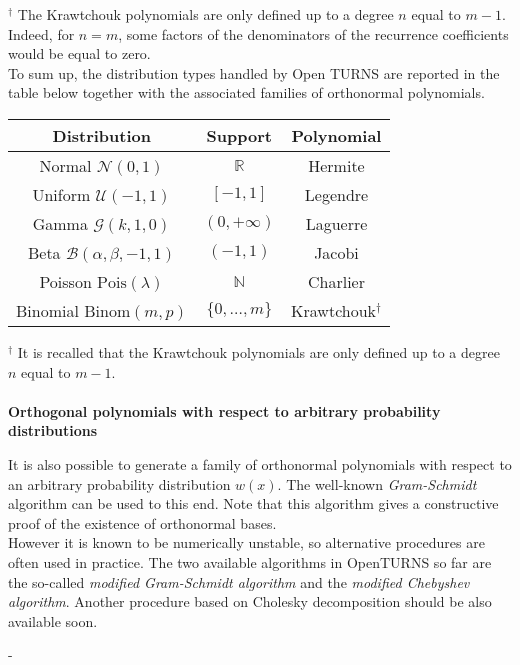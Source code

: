 {\begin{center}
  \end{center} 
{\footnotesize $^{\dagger}$ The Krawtchouk polynomials are only defined up to a degree $n$ equal to $m-1$. Indeed, for $n=m$, some factors of the denominators of the recurrence coefficients would be equal to zero.} \\

To sum up, the distribution types handled by Open TURNS are reported in the table below together with the associated families of orthonormal polynomials. \\

\begin{center}
\begin{tabular}{ccc}
\hline
Distribution & Support & Polynomial \\
\hline
Normal $\mathcal{N}(0,1)$      &  $\mathbb{R}$ & Hermite \\
Uniform	$\mathcal{U}(-1,1)$	&   $[-1,1] $     & Legendre \\
Gamma $\mathcal{G}(k,1,0)$   & $(0,+\infty)$   & Laguerre \\
Beta $\mathcal{B}(\alpha,\beta,-1,1)$     &  $(-1,1)$       & Jacobi \\
Poisson $\mbox{Pois}(\lambda)$ & $\mathbb{N}$ & Charlier \\
Binomial $\mbox{Binom}(m,p)$ & $\{0,\dots,m\}$ & Krawtchouk$^{\dagger}$ \\
\hline
\end{tabular}  
\end{center}
{\footnotesize $^{\dagger}$ It is recalled that the Krawtchouk polynomials are only defined up to a degree $n$ equal to $m-1$.} \\
\\

\textbf{Orthogonal polynomials with respect to arbitrary probability distributions} \vspace{2mm}

It is also possible to generate a family of orthonormal polynomials with respect to an arbitrary probability distribution $w(x)$. The well-known \emph{Gram-Schmidt} algorithm can be used to this end. Note that this algorithm gives a constructive proof of the existence of orthonormal bases.\\

However it is known to be numerically unstable, so alternative procedures are often used in practice. The two available algorithms in OpenTURNS so far are the so-called \emph{modified Gram-Schmidt algorithm} and the \emph{modified Chebyshev algorithm}. Another procedure based on Cholesky decomposition should be also available soon.
}
{-
}

